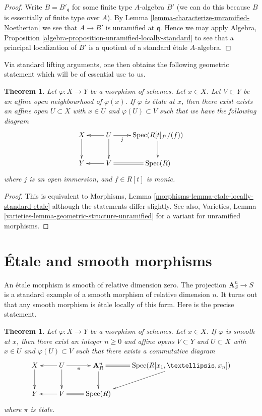 \documentclass{stacks-project}
\theoremstyle{plain}
\newtheorem{theorem}[subsection]{Theorem}
\theoremstyle{definition}
\theoremstyle{remark}
\numberwithin{equation}{subsection}
\def\Spec{\mathop{\mathrm{Spec}}}
\begin{document}
\begin{proof}
Write $B = B'_{\mathfrak q}$ for some finite type $A$-algebra $B'$
(we can do this because $B$ is essentially of finite type over $A$).
By Lemma \ref{lemma-characterize-unramified-Noetherian}
we see that $A \to B'$ is unramified at $\mathfrak q$.
Hence we may apply
Algebra, Proposition \ref{algebra-proposition-unramified-locally-standard}
to see that a principal localization of $B'$ is a quotient of a
standard \'etale $A$-algebra.
\end{proof}

\noindent
Via standard lifting arguments, one then obtains the following geometric
statement which will be of essential use to us.

\begin{theorem}
\label{theorem-geometric-structure}
Let $\varphi : X \to Y$ be a morphism of schemes. Let $x \in X$.
Let $V \subset Y$ be an affine open neighbourhood of $\varphi(x)$.
If $\varphi$ is \'etale at $x$, then there exist exists an affine open
$U \subset X$ with $x \in U$ and $\varphi(U) \subset V$
such that we have the following diagram
$$
\xymatrix{
X \ar[d] & U \ar[l] \ar[d] \ar[r]_-j & \Spec(R[t]_{f'}/(f)) \ar[d] \\
Y & V \ar[l] \ar@{=}[r] & \Spec(R)
}
$$
where $j$ is an open immersion, and $f \in R[t]$ is monic.
\end{theorem}

\begin{proof}
This is equivalent to
Morphisms, Lemma \ref{morphisms-lemma-etale-locally-standard-etale}
although the statements differ slightly.
See also, Varieties, Lemma \ref{varieties-lemma-geometric-structure-unramified}
for a variant for unramified morphisms.
\end{proof}


\section{\'Etale and smooth morphisms}
\label{section-etale-smooth}

\noindent
An \'etale morphism is smooth of relative dimension zero.
The projection $\mathbf{A}^n_S \to S$ is a standard example
of a smooth morphism of relative dimension $n$.
It turns out that any smooth morphism is \'etale locally
of this form. Here is the precise statement.

\begin{theorem}
\label{theorem-smooth-etale-over-n-space}
Let $\varphi : X \to Y$ be a morphism of schemes.
Let $x \in X$.
If $\varphi$ is smooth at $x$, then
there exist an integer $n \geq 0$ and affine opens
$V \subset Y$ and $U \subset X$ with $x \in U$ and $\varphi(U) \subset V$
such that there exists a commutative diagram
$$
\xymatrix{
X \ar[d] & U \ar[l] \ar[d] \ar[r]_-\pi &
\mathbf{A}^n_R \ar[d] \ar@{=}[r] &  \Spec(R[x_1, \ldots, x_n]) \ar[dl] \\
Y & V \ar[l] \ar@{=}[r] & \Spec(R)
}
$$
where $\pi$ is \'etale.
\end{theorem}
\end{document}
